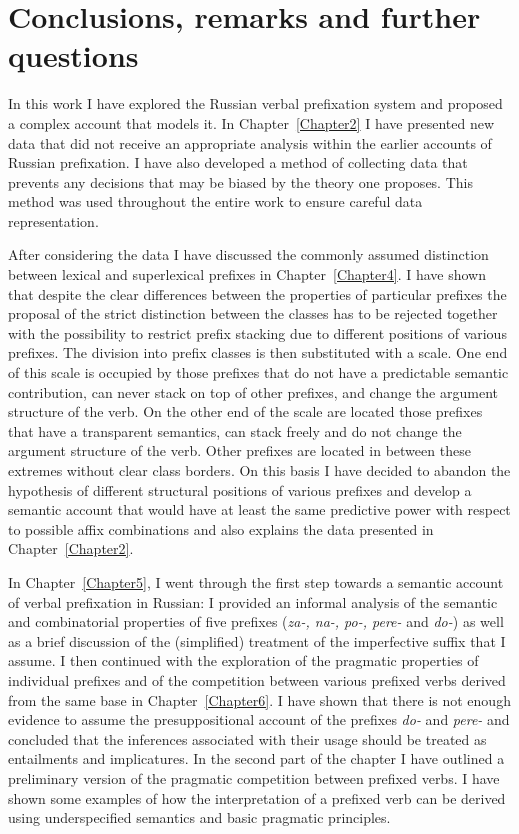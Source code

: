 
\chapter{Conclusions, remarks and further questions} %
\label{Chapter9}

In this work I have explored the Russian verbal prefixation system and proposed a complex account that models it. In Chapter~\ref{Chapter2} I have presented new data that did not receive an appropriate analysis within the earlier accounts of Russian prefixation. I have also developed a method of collecting data that prevents any decisions that may be biased by the theory one proposes. This method was used throughout the entire work to ensure careful data representation.

After considering the data I have discussed the commonly assumed distinction between lexical and superlexical prefixes in Chapter~\ref{Chapter4}. I have shown that despite the clear differences between the properties of particular prefixes the proposal of the strict distinction between the classes has to be rejected together with the possibility to restrict prefix stacking due to different positions of various prefixes. The division into prefix classes is then substituted with a scale. One end of this scale is occupied by those prefixes that do not have a predictable semantic contribution, can never stack on top of other prefixes, and change the argument structure of the verb. On the other end of the scale are located those prefixes that have a transparent semantics, can stack freely and do not change the argument structure of the verb. Other prefixes are located in between these extremes without clear class borders. On this basis I have decided to abandon the hypothesis of different structural positions of various prefixes and develop a semantic account that would have at least the same predictive power with respect to possible affix combinations and also explains the data presented in Chapter~\ref{Chapter2}.

In Chapter~\ref{Chapter5}, I went through the first step towards a semantic account of verbal prefixation in Russian: I provided an informal analysis of the semantic and combinatorial properties of five prefixes (\textit{za-, na-, po-, pere-} and \textit{do-}) as well as a brief discussion of the (simplified) treatment of the imperfective suffix that I assume. I then continued with the exploration of the pragmatic properties of individual prefixes and of the competition between various prefixed verbs derived from the same base in Chapter~\ref{Chapter6}. I have shown that there is not enough evidence to assume the presuppositional account of the prefixes \textit{do-} and \textit{pere-} and concluded that the inferences associated with their usage should be treated as entailments and implicatures. In the second part of the chapter I have outlined a preliminary version of the pragmatic competition between prefixed verbs. I have shown some examples of how the interpretation of a prefixed verb can be derived using underspecified semantics and basic pragmatic principles. 

